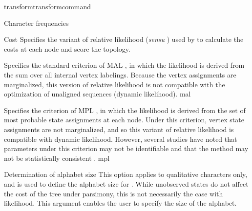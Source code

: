 \begin{command}{transform}{transformcommand}
\begin{arguments}
\begin{argumentgroup} {Character frequencies}
        \end{argumentgroup}

        \begin {argumentgroup} {Cost}
            Specifies the variant of relative likelihood (\textit{sensu}
            \cite{steel2000parsimony}) used by \poy to calculate the costs at
            each node and score the topology.

                {Specifies the standard criterion of MAL \cite{felsenstein1981}, in which the
                likelihood is derived from the sum over all internal
                vertex labelings. Because the vertex assignments are
                marginalized, this version of relative likelihood is not
                compatible with the optimization of unaligned sequences (dynamic likelihood).}
                {mal}

                {Specifies the criterion of MPL \cite{barryandhartigan1987}, in which the likelihood is
                derived from the set of most probable state assignments
                at each node. Under this criterion, vertex state
                assignments are not marginalized, and so this variant of
                relative likelihood is compatible with dynamic
                likelihood. However, several studies have noted that
                parameters under this criterion may not be identifiable
                \cite{zou2011} and that the method may not be statistically consistent
                \cite{mossel2009shrinkage}.}
                {mpl}
    
        \end{argumentgroup}
             
                     
        \begin{argumentgroup}{Determination of alphabet size}
            This option applies to qualitative characters only, and is used to
            define the alphabet size for . While unobserved 
            states do not affect the cost of the tree under parsimony, this is not 
            necessarily the case with likelihood. 
            This argument enables the user to specify the size of the alphabet.


\end{argumentgroup}
\end{arguments}
\end{command}
